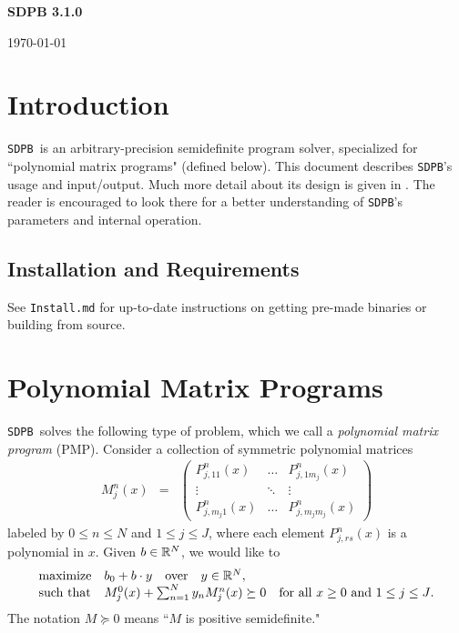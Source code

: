 \documentclass[12pt]{article}
\numberwithin{equation}{section}
\renewcommand{\be}{\begin{eqnarray}}
\renewcommand{\ee}{\end{eqnarray}}
\newcommand\SDPB{\texttt{SDPB}}
\begin{document}
{\Large
\begin{center}
{\bf SDPB 3.1.0 \\\vspace{.1in}}
\end{center}
}
\begin{center}
\noindent \today
\end{center}
\tableofcontents

\section{Introduction}

\SDPB\ is an arbitrary-precision semidefinite program solver, specialized for ``polynomial matrix programs" (defined below).  This document describes \SDPB's usage and input/output.  Much more detail about its design is given in \cite{DSD}. The reader is encouraged to look there for a better understanding of \SDPB's parameters and internal operation.

\subsection{Installation and Requirements}

See \texttt{Install.md} for up-to-date instructions on getting
pre-made binaries or building from source.

\section{Polynomial Matrix Programs}
\label{sec:PMP}

\SDPB\ solves the following type of problem, which we call a {\it polynomial matrix program} (PMP).  Consider a collection of symmetric polynomial matrices
\be
M_j^n(x) &=& \begin{pmatrix}
P_{j,11}^{n}(x) & \dots & P_{j,1m_j}^{n}(x)\\
\vdots & \ddots & \vdots\\
P_{j,m_j1}^{n}(x) & \dots & P^{n}_{j,m_jm_j}(x)
\end{pmatrix}
\ee
labeled by $0 \leq n \leq N$ and $1 \leq j \leq J$,
where each element $P_{j,rs}^{n}(x)$ is a polynomial in $x$.  
Given $b\in \mathbb{R}^N$, we would like to
\be
\label{eq:PMPconstraint}
\begin{array}{ll}
\textrm{maximize} & b_0+b\.y\quad\textrm{over}\quad y \in \R^N,\\
\textrm{such that} & M^0_j(x)+\sum_{n=1}^{N} y_n M^n_j(x) \succeq 0 \quad \textrm{for all $x\geq 0$ and $1 \leq j \leq J$}.
\end{array}
\ee
The notation $M\succeq 0$ means ``$M$ is positive semidefinite."
\end{document}
